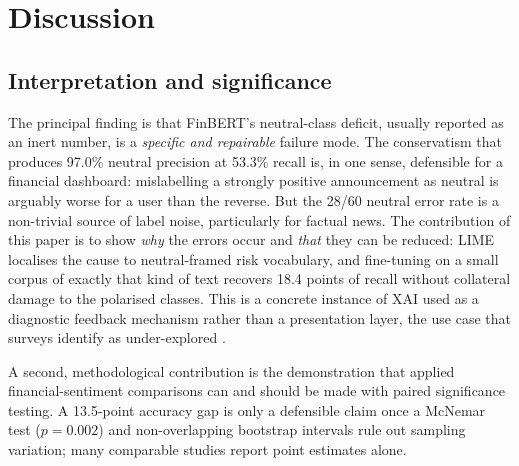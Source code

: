\documentclass[12pt,a4paper]{article}
\begin{document}
\section{Discussion}\label{sec:discussion}
\subsection{Interpretation and significance}
The principal finding is that FinBERT's neutral-class deficit, usually reported as
an inert number, is a \emph{specific and repairable} failure mode. The conservatism
that produces 97.0\% neutral precision at 53.3\% recall is, in one sense, defensible
for a financial dashboard: mislabelling a strongly positive announcement as neutral
is arguably worse for a user than the reverse. But the 28/60 neutral error rate is a
non-trivial source of label noise, particularly for factual news. The contribution
of this paper is to show \emph{why} the errors occur and \emph{that} they can be
reduced: LIME localises the cause to neutral-framed risk vocabulary, and fine-tuning
on a small corpus of exactly that kind of text recovers 18.4 points of recall without
collateral damage to the polarised classes. This is a concrete instance of XAI used
as a diagnostic feedback mechanism rather than a presentation layer, the use case
that surveys identify as under-explored \citep{yeo2025}.

A second, methodological contribution is the demonstration that applied
financial-sentiment comparisons can and should be made with paired significance
testing. A 13.5-point accuracy gap is only a defensible claim once a McNemar test
($p = 0.002$) and non-overlapping bootstrap intervals rule out sampling variation;
many comparable studies report point estimates alone.
\end{document}
